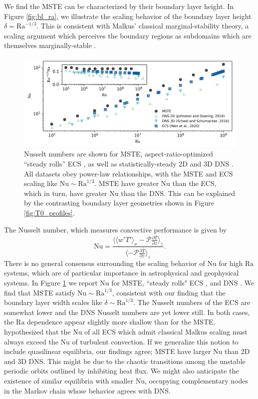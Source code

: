 \documentclass[reprint,amsmath,amssymb,aps]{revtex4-1}
\newcommand\Ra{\mathrm{Ra}}
\newcommand\Nu{\mathrm{Nu}}
\begin{document}
We find the MSTE can be characterized by their boundary layer height.
In Figure \ref{fig:bl_ra}, we illustrate the scaling behavior of the boundary layer height $\delta = \Ra^{-1/3}$. 
This is consistent with Malkus' classical marginal-stability theory, a scaling argument which perceives the boundary regions as subdomains which are themselves marginally-stable \cite{Malkus_1954}.

\begin{figure}
    \centering
    \includegraphics[width=7.1in]{nu_ra.PNG}
    \caption{Nusselt numbers are shown for MSTE, aspect-ratio-optimized ``steady rolls'' ECS \cite{Wen}, as well as statistically-steady 2D and 3D DNS \cite{Johnston, Scheel_2016}.
    All datasets obey power-law relationships, with the MSTE and ECS scaling like $\Nu \sim\Ra^{1/3}$. 
    MSTE have greater $\Nu$ than the ECS, which in turn, have greater $\Nu$ than the DNS. 
    This can be explained by the contrasting boundary layer geometries shown in Figure \ref{fig:T0_profiles}.}%
    \label{fig:nu_vs_ra}%
\end{figure}

The Nusselt number, which measures convective performance is given by
\begin{equation*}
    \Nu = \frac{\langle \langle w'T' \rangle_x - \mathcal{P}\frac{\partial \bar{T}}{\partial z} \rangle_z}{\langle- \mathcal{P}\frac{\partial \bar{T}}{\partial z} \rangle_z}.
\end{equation*}
There is no general consensus surrounding the scaling behavior of $\Nu$ for high $\Ra$ systems, which are of particular importance in astrophysical and geophysical systems. In Figure \ref{fig:nu_vs_ra} we report $\Nu$ for MSTE, ``steady rolls" ECS \cite{Wen}, and DNS \cite{Scheel_2016, Johnston}. 
We find that MSTE satisfy $\Nu \sim\Ra^{1/3}$, consistent with our finding that the boundary layer width scales like $\delta \sim \Ra^{1/3}$.
The Nusselt numbers of the ECS are somewhat lower and the DNS Nusselt numbers are yet lower still.
In both cases, the $\Ra$ dependence appear slightly more shallow than for the MSTE.
\cite{Wen} hypothesized that the $\Nu$ of all ECS which admit classical Malkus scaling must always exceed the $\Nu$ of turbulent convection.
If we generalize this notion to include quasilinear equilibria, our findings agree; MSTE have larger $\Nu$ than 2D and 3D DNS.
This might be due to the chaotic transitions among the unstable periodic orbits outlined by \cite{Yalniz, Cvitanovic} inhibiting heat flux. 
We might also anticipate the existence of similar equilibria with smaller $\Nu$, occupying complementary nodes in the Markov chain whose behavior agrees with DNS. 
\end{document}
